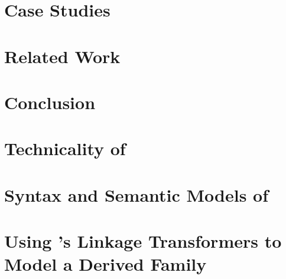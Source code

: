 \section{Case Studies}
\label{sec:casestudies}


\section{Related Work}\label{sec:related-work}


\section{Conclusion}
\label{sec:conclusion}









\newpage

\section*{Technicality of \TT}

\section{Syntax and Semantic Models of \TT}
\label{sec:complete-fmltt}



\section{Using \TT's Linkage Transformers to Model a Derived Family}
\label{sec:lt-in-action}



% 

%
%
%

